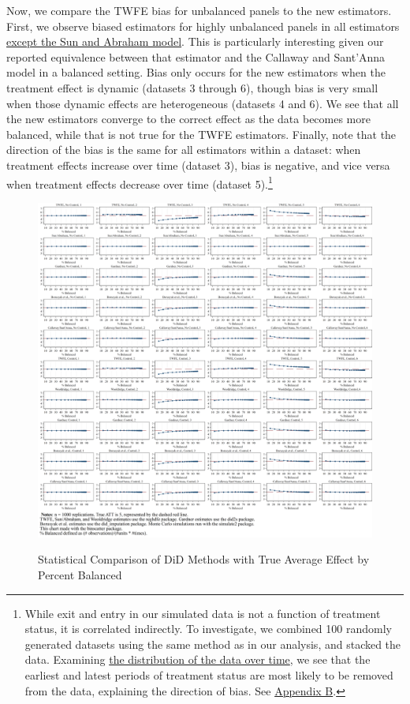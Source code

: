\documentclass[12pt]{article}
\begin{document}
Now, we compare the TWFE bias for unbalanced panels to the new estimators. First, we observe biased estimators for highly unbalanced panels in all estimators \uline{except the Sun and Abraham model}. This is particularly interesting given our reported equivalence between that estimator and the Callaway and Sant’Anna model in a balanced setting. Bias only occurs for the new estimators when the treatment effect is dynamic (datasets 3 through 6), though bias is very small when those dynamic effects are heterogeneous (datasets 4 and 6). We see that all the new estimators converge to the correct effect as the data becomes more balanced, while that is not true for the TWFE estimators. Finally, note that the direction of the bias is the same for all estimators within a dataset: when treatment effects increase over time (dataset 3), bias is negative, and vice versa when treatment effects decrease over time (dataset 5).\footnote{While exit and entry in our simulated data is not a function of treatment status, it is correlated indirectly. To investigate, we combined 100 randomly generated datasets using the same method as in our analysis, and stacked the data. Examining \hyperref[fig:dist-treat]{the distribution of the data over time}, we see that the earliest and latest periods of treatment status are most likely to be removed from the data, explaining the direction of bias. See \hyperref[sec:appendixb]{Appendix B}.}
\begin{figure}[H]
    \centering
    \caption{Statistical Comparison of DiD Methods with True Average Effect by Percent Balanced}
    \includegraphics[width=6in]{Figures/Binscatters by Percent Balanced Common Scale.png}
    \label{fig:estimators-balanced}
\end{figure}
\end{document}

